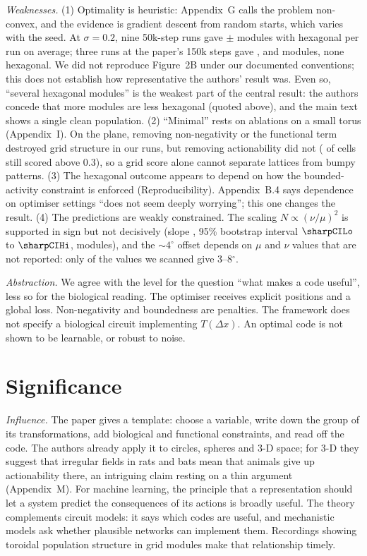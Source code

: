 \documentclass[10pt,letterpaper]{article}
\begin{document}
\emph{Weaknesses.} (1) Optimality is heuristic: Appendix~G calls the problem non-convex, and the evidence is gradient descent from random starts, which varies with the seed. At $\sigma=0.2$, nine 50k-step runs gave \baseModules{}$\pm$\baseModulesSd{} modules with \baseHex{} hexagonal per run on average; three runs at the paper's 150k steps gave \mainLowModulesA, \mainLowModulesB{} and \mainLowModulesC{} modules, none hexagonal. We did not reproduce Figure~2B under our documented conventions; this does not establish how representative the authors' result was. Even so, ``several hexagonal modules'' is the weakest part of the central result: the authors concede that more modules are less hexagonal (quoted above), and the main text shows a single clean population. (2) ``Minimal'' rests on ablations on a small torus (Appendix~I). On the plane, removing non-negativity or the functional term destroyed grid structure in our runs, but removing actionability did not (\ablNoActGrid{} of cells still scored above 0.3), so a grid score alone cannot separate lattices from bumpy patterns. (3) The hexagonal outcome appears to depend on how the bounded-activity constraint is enforced (Reproducibility). Appendix~B.4 says dependence on optimiser settings ``does not seem deeply worrying''; this one changes the result. (4) The predictions are weakly constrained. The scaling $N\propto(\nu/\mu)^2$ is supported in sign but not decisively (slope \sharpSlope, 95\% bootstrap interval $\sharpCILo$ to $\sharpCIHi$, \sharpNMod{} modules), and the $\sim4^\circ$ offset depends on $\mu$ and $\nu$ values that are not reported: only \angleBandFrac{} of the values we scanned give 3--8$^\circ$.

\emph{Abstraction.} We agree with the level for the question ``what makes a code useful'', less so for the biological reading. The optimiser receives explicit positions and a global loss. Non-negativity and boundedness are penalties. The framework does not specify a biological circuit implementing $T(\Delta x)$. An optimal code is not shown to be learnable, or robust to noise.

\section{Significance}
\emph{Influence.} The paper gives a template: choose a variable, write down the group of its transformations, add biological and functional constraints, and read off the code. The authors already apply it to circles, spheres and 3-D space; for 3-D they suggest that irregular fields in rats and bats mean that animals give up actionability there, an intriguing claim resting on a thin argument (Appendix~M). For machine learning, the principle that a representation should let a system predict the consequences of its actions is broadly useful. The theory complements circuit models: it says which codes are useful, and mechanistic models ask whether plausible networks can implement them. Recordings showing toroidal population structure in grid modules \citep{gardner2022} make that relationship timely.
\end{document}
